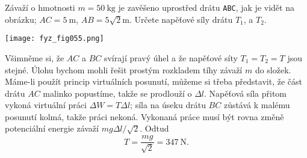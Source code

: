 \begin{example}\label{fyz:fey_exam010}
  Závaží o hmotnosti \(m = \SI{50}{\kg}\) je zavěšeno uprostřed drátu \texttt{ABC}, jak je 
  vidět na obrázku; \(AC = \SI{5}{\m}\), \(AB = 5\sqrt{2}\si{\m}\). Určete napěťové síly drátu 
  \(T_1\), a \(T_2\).
      
  {\centering
   \captionsetup{type=figure}
   \texttt{[image: fyz\_fig055.png]}
  \par}
  
  Všimněme si, že \(AC\) a \(BC\) svírají pravý úhel a že napěťové síty \(T_1 = T_2 = T\) jsou 
  stejné. Úlohu bychom mohli řešit prostým rozkladem tíhy závaží \(m\) do složek. Máme-li 
  použít princip virtuálních posunutí, můžeme si třeba představit, že část drátu \(AC\) malinko 
  popustíme, takže se prodlouží o \(\Delta l\). Napěťová síla přitom vykoná virtuální práci 
  \(\Delta W = T\Delta l\); síla na úseku drátu \(BC\) zůstává k malému posunutí kolmá, takže 
  práci nekoná. Vykonaná práce musí být rovna změně potenciální energie závaží \(mg\Delta 
  l/\sqrt{2}\). Odtud 
  \begin{equation*}
     T = \frac{mg}{\sqrt{2}}=\SI{347}{\newton}.
  \end{equation*}
\end{example}